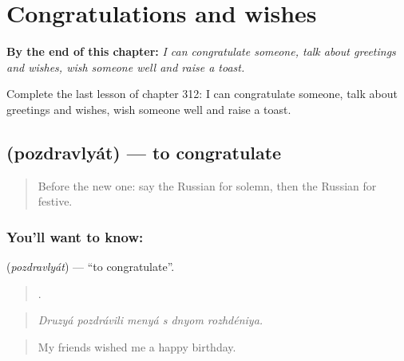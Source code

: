 
\chapter{Congratulations and wishes}
\label{ch:ru-congratulations-and-wishes}

\begin{chapteropening}
\textbf{By the end of this chapter:} \emph{I can congratulate someone, talk about greetings and wishes, wish someone well and raise a toast.}

Complete the last lesson of chapter 312: I can congratulate someone, talk about greetings and wishes, wish someone well and raise a toast.
\end{chapteropening}

\section[\texorpdfstring{\ru{поздравлять} (pozdravlyát)}{поздравлять (pozdravlyát)}]{ (pozdravlyát) — to congratulate}

\label{lesson:RU-C312-pozdravlyat}



\begin{quote}
Before the new one: say the Russian for solemn, then the Russian for festive.
\end{quote}

\subsection*{You'll want to know: }
\textbf{} (\emph{pozdravlyát}) — \textquotedblleft{}to congratulate\textquotedblright{}.

\begin{quote}
     .
\end{quote}

\begin{quote}
\emph{Druzyá pozdrávili menyá s dnyom rozhdéniya.}
\end{quote}

\begin{quote}
My friends wished me a happy birthday.
\end{quote}

